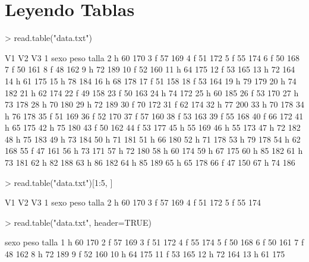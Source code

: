 \documentclass[12pt]{article}
\begin{document}
  \section*{Leyendo Tablas}
\begin{Schunk}
\begin{Sinput}
> read.table("data.txt")
\end{Sinput}
\begin{Soutput}
     V1   V2    V3
1  sexo peso talla
2     h   60   170
3     f   57   169
4     f   51   172
5     f   55   174
6     f   50   168
7     f   50   161
8     f   48   162
9     h   72   189
10    f   52   160
11    h   64   175
12    f   53   165
13    h   72   164
14    h   61   175
15    h   78   184
16    h   68   178
17    f   51   158
18    f   53   164
19    h   79   179
20    h   74   182
21    h   62   174
22    f   49   158
23    f   50   163
24    h   74   172
25    h   60   185
26    f   53   170
27    h   73   178
28    h   70   180
29    h   72   189
30    f   70   172
31    f   62   174
32    h   77   200
33    h   70   178
34    h   76   178
35    f   51   169
36    f   52   170
37    f   57   160
38    f   53   163
39    f   55   168
40    f   66   172
41    h   65   175
42    h   75   180
43    f   50   162
44    f   53   177
45    h   55   169
46    h   55   173
47    h   72   182
48    h   75   183
49    h   73   184
50    h   71   181
51    h   66   180
52    h   71   178
53    h   79   178
54    h   62   168
55    f   47   161
56    h   73   171
57    h   72   180
58    h   60   174
59    h   67   175
60    h   85   182
61    h   73   181
62    h   82   188
63    h   86   182
64    h   85   189
65    h   65   178
66    f   47   150
67    h   74   186
\end{Soutput}
\begin{Sinput}
> read.table("data.txt")[1:5, ]
\end{Sinput}
\begin{Soutput}
    V1   V2    V3
1 sexo peso talla
2    h   60   170
3    f   57   169
4    f   51   172
5    f   55   174
\end{Soutput}
\begin{Sinput}
> read.table("data.txt", header=TRUE) 
\end{Sinput}
\begin{Soutput}
   sexo peso talla
1     h   60   170
2     f   57   169
3     f   51   172
4     f   55   174
5     f   50   168
6     f   50   161
7     f   48   162
8     h   72   189
9     f   52   160
10    h   64   175
11    f   53   165
12    h   72   164
13    h   61   175

\end{Soutput}
\end{Schunk}
\end{document}
